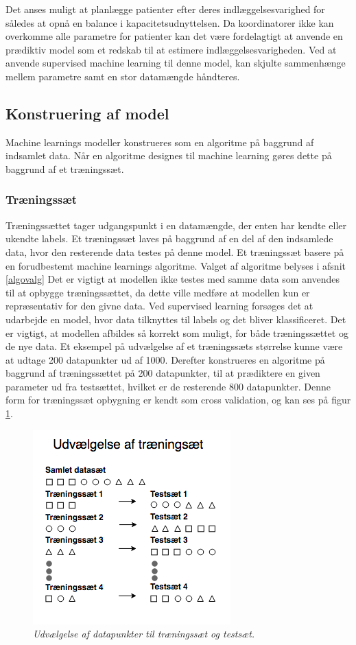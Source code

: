 Det anses muligt at planlægge patienter efter deres indlæggelsesvarighed for således at opnå en balance i kapacitetsudnyttelsen. Da koordinatorer ikke kan overkomme alle parametre for patienter kan det være fordelagtigt at anvende en prædiktiv model som et redskab til at estimere indlæggelsesvarigheden. Ved at anvende supervised machine learning til denne model, kan skjulte sammenhænge mellem parametre samt en stor datamængde håndteres\cite{DIKU2010}.

\subsection{Konstruering af model}
Machine learnings modeller konstrueres som en algoritme på baggrund af indsamlet data.\cite{Kuhn2013}  Når en algoritme designes til machine learning gøres dette på baggrund af et træningssæt. \cite{DIKU2010} 


\subsubsection{Træningssæt}
Træningssættet tager udgangspunkt i en datamængde, der enten har kendte eller ukendte labels. Et træningssæt laves på baggrund af en del af den indsamlede data, hvor den resterende data testes på denne model. Et træningssæt basere på en forudbestemt machine learnings algoritme. Valget af algoritme belyses i afsnit \ref{algovalg}
Det er vigtigt at modellen ikke testes med samme data som anvendes til at opbygge træningssættet, da dette ville medføre at modellen kun er repræsentativ for den givne data.\cite{Kuhn2013} Ved supervised learning forsøges det at udarbejde en model, hvor data tilknyttes til labels og det bliver klassificeret. Det er vigtigt, at modellen afbildes så korrekt som muligt, for både træningssættet og de nye data. Et eksempel på udvælgelse af et træningssæts størrelse kunne være at udtage 200 datapunkter ud af 1000. Derefter konstrueres en algoritme på baggrund af træningssættet på 200 datapunkter, til at prædiktere en given parameter ud fra testsættet, hvilket er de resterende 800 datapunkter. Denne form for træningssæt opbygning er kendt som cross validation, og kan ses på figur \ref{fig:xval}\cite{Kuhn2013}.


\begin{figure}[H]
	\centering
	\includegraphics[scale=.7]{figures/xval.png}
	\caption{\textit{Udvælgelse af datapunkter til træningssæt og testsæt.}\cite{Kuhn2013}}
	\label{fig:xval}
\end{figure}

